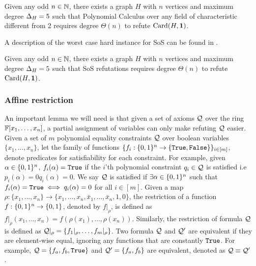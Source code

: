 \documentclass[11pt]{article}
\providecommand{\DIFadd}[1]{\textcolor{shin-ryoku}{#1}}%
\providecommand{\DIFdel}[1]{\textcolor{verylightgray}{\sout{#1}}}                      %
\providecommand{\DIFaddbegin}{} %
\providecommand{\DIFaddend}{} %
\providecommand{\DIFdelbegin}{} %
\providecommand{\DIFdelend}{} %
\begin{document}
\begin{lemma}\label{lemma:worst-case-instance-PC}Given any odd $n \in \mathbb{N}$, there exists a graph $H$ with $n$ vertices and maximum degree $\Delta_{H}= 5$ such that Polynomial Calculus over any field of characteristic different from 2 requires degree $\Theta(n)$ to refute $\text{Card}(H, \mathbf{1})$.
\end{lemma}
A description of the  worst case hard instance for SoS can be found in \citep[Theorem A.3]{Austrin_2022}.

\begin{lemma}\label{lemma:worst-case-instance-sos}
Given any odd $n \in \mathbb{N}$, there exists a graph $H$ with $n$ vertices and maximum degree $\Delta_{H}= 5$ such that SoS refutations requires degree $\Theta(n)$ to refute $\text{Card}(H, \mathbf{1})$.
\end{lemma}

\subsubsection{Affine restriction} 

An important lemma we will need is that given a set of axioms $\mathcal{Q}$ over the ring $\mathbb{F}[x_1, \dots, x_n]$, a partial assignment of variables can only make refuting $\mathcal{Q}$ easier.
Given a set of $m$ polynomial equality constraints $\mathcal{Q}$ over boolean variables $\{x_1, \dots, x_n\}$, let the family of functions $\{f_i: \{0,1\}^n \rightarrow \{\texttt{True},\texttt{False}\} \}_{i \in [m]}$, denote predicates for satisfiability for each constraint.
For example, given $\alpha \in \{0,1\}^n$, $f_i(\alpha) = \texttt{True}$ if the $i$'th polynomial constraint $q_i \in \mathcal{Q}$ is satisfied i.e \DIFdelbegin \DIFdel{$p_i(\alpha) = 0$}\DIFdelend \DIFaddbegin \DIFadd{$q_i(\alpha) = 0$}\DIFaddend .
We say $\mathcal{Q}$ is satisfied if $\exists \alpha \in \{0,1\}^n$ such that $f_i(\alpha) = \texttt{True} \iff q_i(\alpha)=0$ for all $i \in [m]$.
Given a map $\rho: \{x_1, \dots, x_n \} \rightarrow \{x_1, \dots, x_n, \bar{x}_1, \dots, \bar{x}_n, 1, 0 \}$, the restriction of a function $f: \{0,1\}^n \rightarrow \{0,1\}$, denoted by $f|_\rho$, is defined as $f|_\rho(x_1, \dots, x_n) = f(\rho(x_1), \dots, \rho(x_n))$.
Similarly, the restriction of formula $\mathcal{Q}$ is defined as $\mathcal{Q}|_\rho = \{f_{1}|_\rho, \dots, f_{m}|_\rho \}$.
Two formula $\mathcal{Q}$ and $\mathcal{Q}'$ are equivalent if they are element-wise equal, ignoring any functions that are constantly $\texttt{True}$.
For example, $\mathcal{Q} = \{f_a, f_b, \texttt{True} \}$ and $\mathcal{Q}' = \{f_a, f_b\}$ are equivalent, denoted as $\mathcal{Q} \equiv \mathcal{Q}'$.
\end{document}
